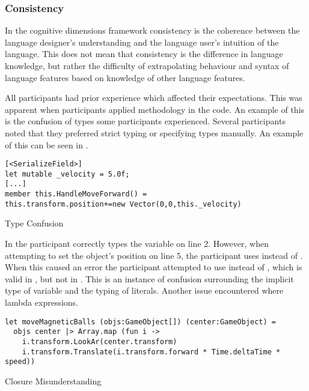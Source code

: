 \subsubsection{Consistency} %
In the cognitive dimensions framework consistency is the coherence between the language designer's understanding and the language user's intuition of the language\cite{green1996usability}. This does not mean that consistency is the difference in language knowledge, but rather the difficulty of extrapolating behaviour and syntax of language features based on knowledge of other language features.

All participants had prior \cs experience which affected their expectations. This was apparent when participants applied \cs methodology in the \fs code. An example of this is the confusion of types some participants experienced. Several participants noted that they preferred strict typing or specifying types manually. An example of this can be seen in .

\begin{listing}[H]
\begin{verbatim}
[<SerializeField>]
let mutable _velocity = 5.0f;
[...]
member this.HandleMoveForward() =
this.transform.position+=new Vector(0,0,this._velocity)
\end{verbatim}
\caption{Type Confusion}
\label{lst:type-conf}
\end{listing}

In  the participant correctly types the  variable on line 2. However, when attempting to set the object's position on line 5, the participant uses  instead of . When this caused an error the participant attempted to use  instead of , which is valid in \cs, but not in \fs. This is an instance of confusion surrounding the implicit type of variable and the typing of literals. Another issue encountered where lambda expressions.

\begin{listing}[H]
\begin{verbatim}
let moveMagneticBalls (objs:GameObject[]) (center:GameObject) =
  objs center |> Array.map (fun i ->
    i.transform.LookAr(center.transform)
    i.transform.Translate(i.transform.forward * Time.deltaTime * speed))
\end{verbatim}
\caption{Closure Misunderstanding}
\label{lst:clos-mis}
\end{listing}


